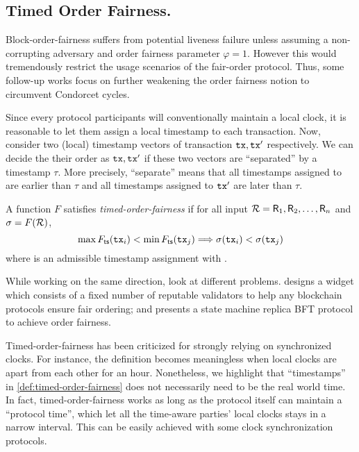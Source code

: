 \subsection{Timed Order Fairness.}

Block-order-fairness suffers from potential liveness failure unless assuming a non-corrupting adversary and order fairness parameter $\varphi = 1$.
%
However this would tremendously restrict the usage scenarios of the fair-order protocol.
%
Thus, some follow-up works \cite{AFT:Kursawe20,OSDI:ZSCZA20} focus on further weakening the order fairness notion to circumvent Condorcet cycles.

Since every protocol participants will conventionally maintain a local clock, it is reasonable to let them assign a local timestamp to each transaction.
%
Now, consider two (local) timestamp vectors of transaction $\mathtt{tx}, \mathtt{tx}'$ respectively.
%
We can decide the their order as $\mathtt{tx}, \mathtt{tx}'$ if these two vectors are ``separated'' by a timestamp $\tau$.
%
More precisely, ``separate'' means that all timestamps assigned to \tx are earlier than $\tau$ and all timestamps assigned to $\mathtt{tx}'$ are later than $\tau$.

\begin{definition}
    \label{def:timed-order-fairness}

    A function $F$ satisfies \emph{timed-order-fairness} if for all input $\mathcal{R} = \mathsf{R}_1, \mathsf{R}_2, \ldots, \mathsf{R}_n$ and $\sigma = F(\mathcal{R})$,
    \[
        \max F_{\mathsf{ts}}(\mathtt{tx}_i) < \min F_{\mathsf{ts}}(\mathtt{tx}_j) \Longrightarrow \sigma(\mathtt{tx}_i) < \sigma(\mathtt{tx}_j)
    \]
    where \mapTimestamp is an admissible timestamp assignment with \profileSet.
\end{definition}

While working on the same direction, \cite{AFT:Kursawe20,OSDI:ZSCZA20} look at different problems. \cite{AFT:Kursawe20} designs a widget which consists of a fixed number of reputable validators to help any blockchain protocols ensure fair ordering; and \cite{OSDI:ZSCZA20} presents a state machine replica BFT protocol to achieve order fairness.

Timed-order-fairness has been criticized for strongly relying on synchronized clocks.
%
For instance, the definition becomes meaningless when local clocks are apart from each other for an hour.
%
Nonetheless, we highlight that ``timestamps'' in \cref{def:timed-order-fairness} does not necessarily need to be the real world time.
%
In fact, timed-order-fairness works as long as the protocol itself can maintain a ``protocol time'', which let all the time-aware parties' local clocks stays in a narrow interval.
%
This can be easily achieved with some clock synchronization protocols.
